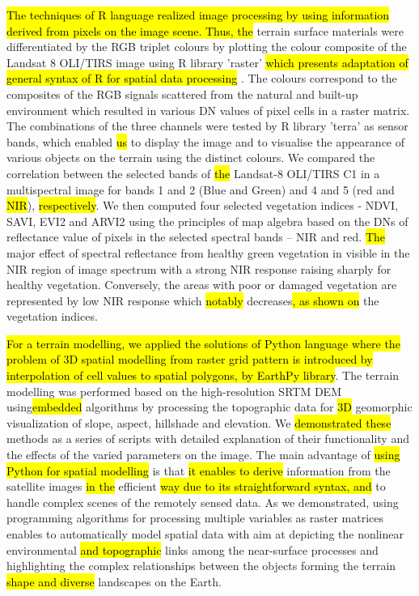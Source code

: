 \documentclass[jimaging,article,submit,pdftex,moreauthors]{Definitions/mdpi}
\begin{document}
\hl{The techniques of R language realized image processing by using information derived from pixels on the image scene. Thus, the} terrain surface materials were differentiated by the RGB triplet colours by plotting the colour composite of the Landsat\hl{ }8 OLI/TIRS image using R library 'raster' \hl{which presents adaptation of general syntax of R for spatial data processing }. The colours correspond to the composites of the RGB signals scattered from the natural and built-up environment which resulted in various DN values of pixel cells in a raster matrix. The combinations of the three channels were tested by\hl{ }R library 'terra' as sensor bands, which enabled \hl{us} to display the image and to visualise the appearance of various objects on the terrain using the distinct colours. We compared the correlation between\hl{ } the selected bands of \hl{the} Landsat-8 OLI/TIRS C1 in a multispectral image for bands 1 and 2 (Blue and Green) and 4 and 5 (red and \hl{NIR}), \hl{respectively}. We then computed \hl{} four selected vegetation indices - NDVI, SAVI, EVI2 and ARVI2 using the principles of map algebra based on the DNs of reflectance value of pixels in the selected spectral bands -- NIR and red. \hl{The} major effect of spectral reflectance from healthy green vegetation in visible in the NIR region of image spectrum with a strong NIR response raising sharply for healthy vegetation. Conversely, the areas with poor or damaged vegetation are represented by\hl{ }low NIR response which \hl{notably} decreases\hl{, as shown on} the vegetation indices. 

\hl{For a terrain modelling, we applied the solutions of Python language where the problem of 3D spatial modelling from raster grid pattern is introduced by interpolation of cell values to spatial polygons, by EarthPy library}. The terrain modelling was performed based on the high-resolution SRTM DEM using\hl{embedded }algorithms by processing the topographic\hl{ }data for \hl{3D} geomorphic visualization of slope, aspect, hillshade and elevation. We \hl{ demonstrated these} methods as a series of scripts with detailed explanation of their functionality and the effects of the varied parameters on the image. The main advantage of \hl{using Python for spatial modelling} is that \hl{it enables to derive }information from the satellite images\hl{ in the } efficient \hl{way due to its straightforward syntax, and} to handle complex scenes of the remotely sensed data. As we demonstrated, using programming algorithms for processing multiple variables as raster matrices enables to automatically model spatial data with aim at depicting the nonlinear environmental \hl{and topographic} links among the near-surface processes and highlighting the complex relationships between the objects forming the terrain \hl{shape and diverse} landscapes on the Earth. 
\end{document}
